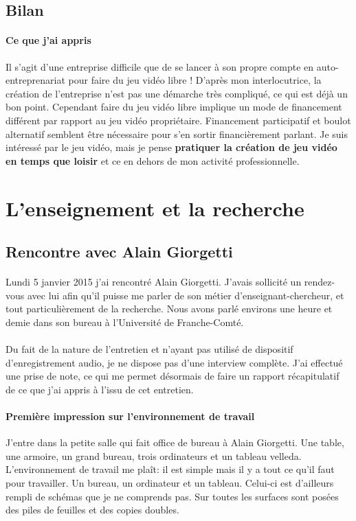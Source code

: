 \documentclass[a4paper,12pt, draft]{report}
\begin{document}
\subsection{Bilan}
\paragraph{Ce que j'ai appris}
Il s'agit d'une entreprise difficile que de se lancer à son propre compte en auto-entreprenariat pour faire du jeu vidéo libre ! D'après mon interlocutrice, la création de l'entreprise n'est pas une démarche très compliqué, ce qui est déjà un bon point. Cependant faire du jeu vidéo libre implique un mode de financement différent par rapport au jeu vidéo propriétaire. Financement participatif et boulot alternatif semblent être nécessaire pour s'en sortir financièrement parlant.
Je suis intéressé par le jeu vidéo, mais je pense \textbf{pratiquer la création de jeu vidéo en temps que loisir} et ce en dehors de mon activité professionnelle.

\section{L'enseignement et la recherche}
\subsection{Rencontre avec Alain Giorgetti}

\paragraph{}
Lundi 5 janvier 2015 j'ai rencontré Alain Giorgetti. J'avais sollicité un rendez-vous avec lui afin qu'il puisse me parler de son métier d'enseignant-chercheur, et tout particulièrement de la recherche. Nous avons parlé environs une heure et demie dans son bureau à l'Université de Franche-Comté.
\paragraph{}
Du fait de la nature de l'entretien et n'ayant pas utilisé de dispositif d'enregistrement audio, je ne dispose pas d'une interview complète. J'ai effectué une prise de note, ce qui me permet désormais de faire un rapport récapitulatif de ce que j'ai appris à l'issu de cet entretien.

\paragraph{Première impression sur l'environnement de travail}
J'entre dans la petite salle qui fait office de bureau à Alain Giorgetti. Une table, une armoire, un grand bureau, trois ordinateurs et un tableau velleda. L'environnement de travail me plaît: il est simple mais il y a tout ce qu'il faut pour travailler. Un bureau, un ordinateur et un tableau. Celui-ci est d'ailleurs rempli de schémas que je ne comprends pas. Sur toutes les surfaces sont posées des piles de feuilles et des copies doubles.
\end{document}
